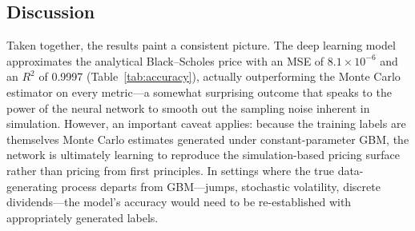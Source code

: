 \documentclass[conference]{IEEEtran}
\begin{document}
\begin{table}[htbp]
\caption{System Module Validation Results}
\label{tab:validation}
\centering
\small
\setlength{\tabcolsep}{5pt}
\renewcommand{\arraystretch}{1.05}
\end{table}

\subsection{Discussion}

Taken together, the results paint a consistent picture. The deep learning model approximates the analytical Black--Scholes price with an MSE of $8.1 \times 10^{-6}$ and an $R^2$ of 0.9997 (Table~\ref{tab:accuracy}), actually outperforming the Monte Carlo estimator on every metric---a somewhat surprising outcome that speaks to the power of the neural network to smooth out the sampling noise inherent in simulation. However, an important caveat applies: because the training labels are themselves Monte Carlo estimates generated under constant-parameter GBM, the network is ultimately learning to reproduce the simulation-based pricing surface rather than pricing from first principles. In settings where the true data-generating process departs from GBM---jumps, stochastic volatility, discrete dividends---the model's accuracy would need to be re-established with appropriately generated labels.
\end{document}

